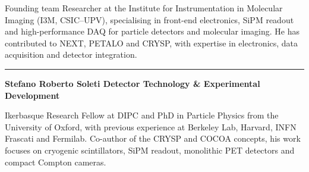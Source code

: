 \documentclass[aspectratio=169,11pt]{beamer}
\begin{document}
\begin{frame}{Founding team}
{\tiny
Researcher at the Institute for Instrumentation in Molecular Imaging
(I3M, CSIC--UPV), specialising in front-end electronics, SiPM readout
and high-performance DAQ for particle detectors and molecular imaging.
He has contributed to NEXT, PETALO and CRYSP, with expertise in
electronics, data acquisition and detector integration.
}


{\color{gray!35}\rule{\textwidth}{0.35pt}}



{\scriptsize\bfseries\color{PTblue}
Stefano Roberto Soleti
\hfill
{\tiny\bfseries\color{black}
Detector Technology \& Experimental Development}
}



{\tiny
Ikerbasque Research Fellow at DIPC and PhD in Particle Physics from
the University of Oxford, with previous experience at Berkeley Lab,
Harvard, INFN Frascati and Fermilab. Co-author of the CRYSP and COCOA
concepts, his work focuses on cryogenic scintillators, SiPM readout,
monolithic PET detectors and compact Compton cameras.
}

\vfill

\end{frame}


\end{document}
